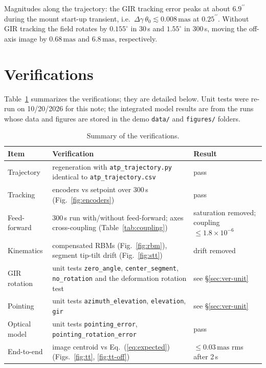 \documentclass{gmto}
\numberwithin{table}{section}
\numberwithin{equation}{section}
\newcommand{\code}[1]{\texttt{#1}}
\newcommand{\mas}{\,\mathrm{mas}}
\newcommand{\arcsec}{^{\prime\prime}}
\begin{document}
Magnitudes along the trajectory: the GIR tracking error peaks at about $6.9\arcsec$ during the
mount start-up transient, i.e.\ $\Delta\gamma\,\theta_0 \lesssim 0.008\mas$ at $0.25\arcsec$.
Without GIR tracking the field rotates by $0.155^\circ$ in 30\,s and $1.55^\circ$ in 300\,s,
moving the off-axis image by $0.68\mas$ and $6.8\mas$, respectively.

\section{Verifications}
\label{sec:verification}

Table~\ref{tab:verif} summarizes the verifications; they are detailed below. Unit tests were re-run
on 10/20/2026 for this note; the integrated model results are from the runs whose data and figures
are stored in the demo \code{data/} and \code{figures/} folders.

\begin{table}[htbp]
  \centering
  \caption{Summary of the verifications.}
  \label{tab:verif}
  \begin{tabularx}{\linewidth}{lXl}
    \toprule
    Item & Verification & Result \\
    \midrule
    Trajectory      & regeneration with \code{atp\_trajectory.py} identical to \code{atp\_trajectory.csv} & pass \\
    Tracking        & encoders vs setpoint over 300\,s (Fig.~\ref{fig:encoders}) & pass \\
    Feed-forward    & 300\,s run with/without feed-forward; axes cross-coupling (Table~\ref{tab:coupling}) & saturation removed; coupling $\le 1.8\times10^{-6}$ \\
    Kinematics      & compensated RBMs (Fig.~\ref{fig:rbm}), segment tip-tilt drift (Fig.~\ref{fig:stt}) & drift removed \\
    GIR rotation    & unit tests \code{zero\_angle}, \code{center\_segment}, \code{no\_rotation} and the deformation rotation test & see \S\ref{sec:ver-unit} \\
    Pointing        & unit tests \code{azimuth\_elevation}, \code{elevation}, \code{gir} & see \S\ref{sec:ver-unit} \\
    Optical model   & unit tests \code{pointing\_error}, \code{pointing\_rotation\_error} & pass \\
    End-to-end      & image centroid vs Eq.~(\ref{eq:expected}) (Figs.~\ref{fig:tt}, \ref{fig:tt-off}) & $\le 0.03\mas$ rms after 2\,s \\
    \bottomrule
  \end{tabularx}
\end{table}
\end{document}
